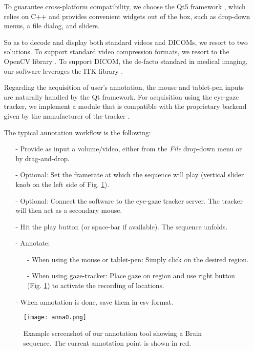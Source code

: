 To guarantee cross-platform compatibility, we choose the Qt5 framework \cite{eng16}, which relies
on C++ and provides convenient widgets out of the box, such as drop-down menus, a file dialog, and sliders.

So as to decode and display both standard videos and DICOMs, we resort to two solutions.
To support standard video compression formats, we resort to the OpenCV library \cite{opencv}.
To support DICOM, the de-facto standard in medical imaging, our software leverages the ITK library \cite{johnson15}.

Regarding the acquisition of user's annotation, the mouse and tablet-pen inputs are naturally
handled by the Qt framework.
For acquisition using the eye-gaze tracker, we implement a module that is compatible with the proprietary backend given by the manufacturer of the tracker \cite{eyetribe}.

The typical annotation workflow is the following:

\begin{itemize}
  \item[-]{Provide as input a volume/video, either from the \textit{File} drop-down menu or by drag-and-drop.}
  \item[-]{Optional: Set the framerate at which the sequence will play (vertical slider knob on the left side of Fig. \ref{fig:anna}).}
  \item[-]{Optional: Connect the software to the eye-gaze tracker server. The tracker will then act as a secondary mouse.}
  \item[-]{Hit the play button (or space-bar if available). The sequence unfolds.}
  \item[-]{Annotate:}
    \begin{itemize}
      \item[-]{When using the mouse or tablet-pen: Simply click on the desired region.}
      \item[-]{When using gaze-tracker: Place gaze on region and use right button (Fig. \ref{fig:anna}) to activate the recording of locations.}
    \end{itemize}
  \item[-]{When annotation is done, save them in \gls{csv} format.}
\end{itemize}

\begin{figure}[!htpb]
  \texttt{[image: anna0.png]}
  \caption{Example screenshot of our annotation tool showing a Brain sequence.
  The current annotation point is shown in red.}
  \label{fig:anna}
\end{figure}

